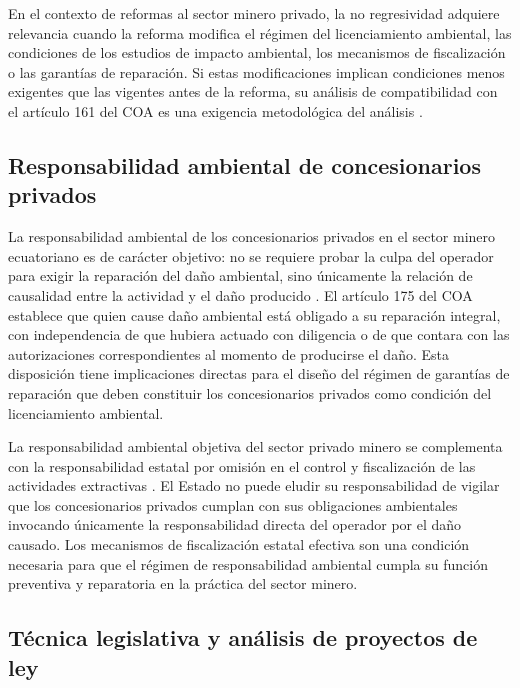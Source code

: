 En el contexto de reformas al sector minero privado, la no regresividad adquiere relevancia cuando la reforma modifica el régimen del licenciamiento ambiental, las condiciones de los estudios de impacto ambiental, los mecanismos de fiscalización o las garantías de reparación. Si estas modificaciones implican condiciones menos exigentes que las vigentes antes de la reforma, su análisis de compatibilidad con el artículo 161 del COA es una exigencia metodológica del análisis \parencite{sanchez_romero_et_al_2026}.

\subsection{Responsabilidad ambiental de concesionarios privados}

La responsabilidad ambiental de los concesionarios privados en el sector minero ecuatoriano es de carácter objetivo: no se requiere probar la culpa del operador para exigir la reparación del daño ambiental, sino únicamente la relación de causalidad entre la actividad y el daño producido \parencite{coa_2017}. El artículo 175 del COA establece que quien cause daño ambiental está obligado a su reparación integral, con independencia de que hubiera actuado con diligencia o de que contara con las autorizaciones correspondientes al momento de producirse el daño. Esta disposición tiene implicaciones directas para el diseño del régimen de garantías de reparación que deben constituir los concesionarios privados como condición del licenciamiento ambiental.

La responsabilidad ambiental objetiva del sector privado minero se complementa con la responsabilidad estatal por omisión en el control y fiscalización de las actividades extractivas \parencite{medina_garcia_2026}. El Estado no puede eludir su responsabilidad de vigilar que los concesionarios privados cumplan con sus obligaciones ambientales invocando únicamente la responsabilidad directa del operador por el daño causado. Los mecanismos de fiscalización estatal efectiva son una condición necesaria para que el régimen de responsabilidad ambiental cumpla su función preventiva y reparatoria en la práctica del sector minero.

\subsection{Técnica legislativa y análisis de proyectos de ley}

